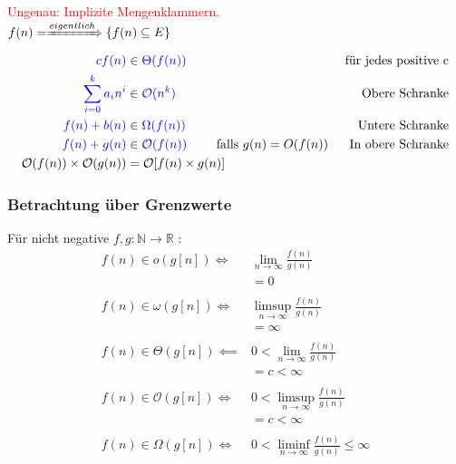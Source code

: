 \documentclass[a4paper]{scrartcl}
\begin{document}
			\textcolor{red}{ Ungenau: Implizite Mengenklammern.\\ 
				\( f ( n ) = \xRightarrow{eigentlich}  \{ f ( n ) \subseteq E \} \)	
			}
			\begin{align*}
				\textcolor{blue} { cf ( n ) } & \in \textcolor{blue} { \Theta ( f (n)) }  &\text{ für jedes positive c} \\
				\textcolor{blue} { \sum_{i = 0}^{ k } a_i n^i } & \in \textcolor{blue} { \mathcal{O} ( n^k ) }  &\text{ Obere Schranke} \\
				\textcolor{blue} { f( n ) + b ( n ) } & \in \textcolor{blue} { \Omega ( f( n )) } &\text{ Untere Schranke} \\
				\textcolor{blue} { f ( n ) + g ( n ) } & \in \textcolor{blue} { \mathcal{O} ( f ( n)) } \qquad \text{ falls } g ( n ) = O ( f ( n ))  &\text{ In obere Schranke} \\
				\mathcal{O} ( f ( n )) \times \mathcal{O} ( g ( n )) &=  \mathcal{O} [ f ( n ) \times g ( n) ] 
			\end{align*}
			
			\subsubsection{Betrachtung über Grenzwerte}
			Für nicht negative \(f, g : \mathbb{N} \rightarrow \mathbb{R} \) :\\
			\begin{align*}
				f(n) \in o(g[n]) \iff& \lim\limits_{n\rightarrow \infty} \frac{f(n)}{g(n)}\\
				 &= 0\\
				 \\
				f(n) \in \omega(g[n]) \iff& \limsup \limits_{n\rightarrow \infty} \frac{f(n)}{g(n)}\\
				 &= \infty\\
				 \\
				f(n) \in \Theta(g[n]) \impliedby & 0 < \lim \limits_{n\rightarrow \infty} \frac{f(n)}{g(n)}\\
				 &= c < \infty\\
				 \\
				f(n) \in \mathcal{O}(g[n]) \iff& 0 < \limsup \limits_{n\rightarrow \infty} \frac{f(n)}{g(n)}\\
				 &= c < \infty\\
				 \\
				f(n) \in \Omega (g[n]) \iff& 0 < \liminf \limits_{n\rightarrow \infty} \frac{f(n)}{g(n)} \leq \infty\\
			\end{align*}
			
\end{document}
